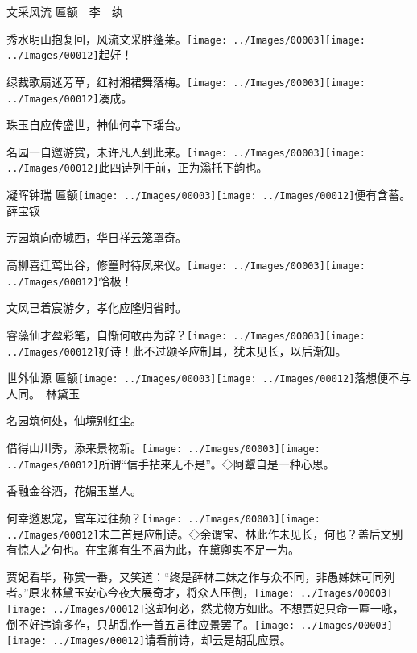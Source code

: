 文采风流 {匾额}　李　纨

秀水明山抱复回，风流文采胜蓬莱。{\texttt{[image: ../Images/00003]}\texttt{[image: ../Images/00012]}\footnotesize \kaishu 起好！}

绿裁歌扇迷芳草，红衬湘裙舞落梅。{\texttt{[image: ../Images/00003]}\texttt{[image: ../Images/00012]}\footnotesize \kaishu 凑成。}

珠玉自应传盛世，神仙何幸下瑶台。

名园一自邀游赏，未许凡人到此来。{{\texttt{[image: ../Images/00003]}\texttt{[image: ../Images/00012]}\footnotesize \kaishu 此四诗列于前，正为}滃{托下韵也。}}

凝晖钟瑞
{匾额{\texttt{[image: ../Images/00003]}\texttt{[image: ../Images/00012]}\footnotesize \kaishu 便有含蓄。}}　薛宝钗

芳园筑向帝城西，华日祥云笼罩奇。

高柳喜迁莺出谷，修篁时待凤来仪。{\texttt{[image: ../Images/00003]}\texttt{[image: ../Images/00012]}\footnotesize \kaishu 恰极！}

文风已着宸游夕，孝化应隆归省时。

睿藻仙才盈彩笔，自惭何敢再为辞？{\texttt{[image: ../Images/00003]}\texttt{[image: ../Images/00012]}\footnotesize \kaishu 好诗！此不过颂圣应制耳，犹未见长，以后渐知。}

世外仙源
{匾额{\texttt{[image: ../Images/00003]}\texttt{[image: ../Images/00012]}\footnotesize \kaishu 落想便不与人同。}}　林黛玉

名园筑何处，仙境别红尘。

借得山川秀，添来景物新。{\texttt{[image: ../Images/00003]}\texttt{[image: ../Images/00012]}\footnotesize \kaishu 所谓``信手拈来无不是''。◇阿颦自是一种心思。}

香融金谷酒，花媚玉堂人。

何幸邀恩宠，宫车过往频？{\texttt{[image: ../Images/00003]}\texttt{[image: ../Images/00012]}\footnotesize \kaishu 末二首是应制诗。◇余谓宝、林此作未见长，何也？盖后文别有惊人之句也。在宝卿有生不屑为此，在黛卿实不足一为。}

贾妃看毕，称赏一番，又笑道：``终是薛林二妹之作与众不同，非愚姊妹可同列者。''原来林黛玉安心今夜大展奇才，将众人压倒，{\texttt{[image: ../Images/00003]}\texttt{[image: ../Images/00012]}\footnotesize \kaishu 这却何必，然尤物方如此。}不想贾妃只命一匾一咏，倒不好违谕多作，只胡乱作一首五言律应景罢了。{\texttt{[image: ../Images/00003]}\texttt{[image: ../Images/00012]}\footnotesize \kaishu 请看前诗，却云是胡乱应景。}

